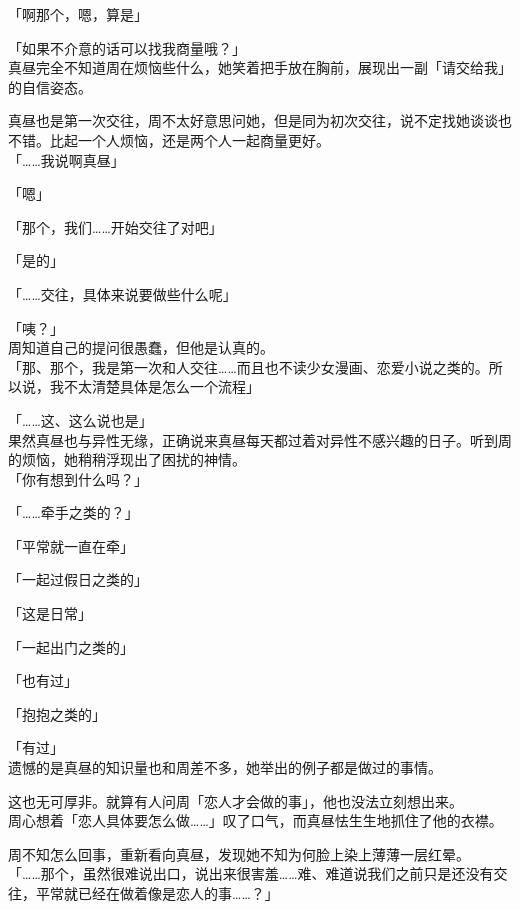 「啊那个，嗯，算是」

「如果不介意的话可以找我商量哦？」\\

真昼完全不知道周在烦恼些什么，她笑着把手放在胸前，展现出一副「请交给我」的自信姿态。

真昼也是第一次交往，周不太好意思问她，但是同为初次交往，说不定找她谈谈也不错。比起一个人烦恼，还是两个人一起商量更好。\\

「……我说啊真昼」

「嗯」

「那个，我们……开始交往了对吧」

「是的」

「……交往，具体来说要做些什么呢」

「咦？」\\

周知道自己的提问很愚蠢，但他是认真的。\\

「那、那个，我是第一次和人交往……而且也不读少女漫画、恋爱小说之类的。所以说，我不太清楚具体是怎么一个流程」

「……这、这么说也是」\\

果然真昼也与异性无缘，正确说来真昼每天都过着对异性不感兴趣的日子。听到周的烦恼，她稍稍浮现出了困扰的神情。\\

「你有想到什么吗？」

「……牵手之类的？」

「平常就一直在牵」

「一起过假日之类的」

「这是日常」

「一起出门之类的」

「也有过」

「抱抱之类的」

「有过」\\

遗憾的是真昼的知识量也和周差不多，她举出的例子都是做过的事情。

这也无可厚非。就算有人问周「恋人才会做的事」，他也没法立刻想出来。\\

周心想着「恋人具体要怎么做……」叹了口气，而真昼怯生生地抓住了他的衣襟。

周不知怎么回事，重新看向真昼，发现她不知为何脸上染上薄薄一层红晕。\\

「……那个，虽然很难说出口，说出来很害羞……难、难道说我们之前只是还没有交往，平常就已经在做着像是恋人的事……？」\\

